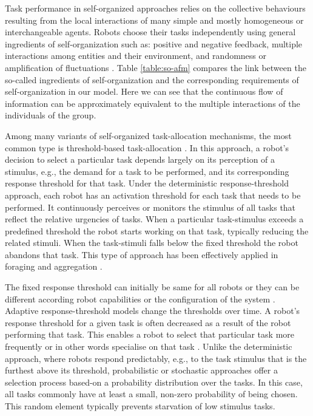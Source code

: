 \documentclass[smallcondensed]{svjour3}
\begin{document}
Task performance in self-organized approaches relies on the collective behaviours resulting from the local interactions of many simple and mostly homogeneous or interchangeable agents. Robots choose their tasks independently using general ingredients of self-organization such as: positive and negative feedback, multiple interactions among entities and their environment, and randomness or amplification of fluctuations \citep{Camazine+2001}. Table \ref{table:so-afm} compares the link between the so-called ingredients of self-organization and the corresponding requirements of self-organization in our model. Here we can see that the continuous flow of information can be approximately equivalent to the multiple interactions of the individuals of the group.

Among many variants of self-organized task-allocation mechanisms, the most common type is threshold-based task-allocation \citep{Bonabeau+1999}. In this approach, a robot's decision to select a particular task depends largely on its perception of a stimulus, e.g., the demand for a task to be performed, and its corresponding response threshold for that task. Under the deterministic response-threshold approach, each robot has an activation threshold for each task that needs to be performed. It continuously perceives or monitors the stimulus of all tasks that reflect the relative urgencies of tasks. When a particular task-stimulus exceeds a predefined threshold the robot starts working on that task, typically reducing the related stimuli. When the task-stimuli falls below the fixed threshold the robot abandons that task. This type of approach has been effectively applied in foraging \citep{Liu+2007,Krieger+2000} and aggregation \citep{Agassounon+2002}. 

The fixed response threshold can initially be same for all robots \citep{Jones+2000} or they can be different according robot capabilities or the configuration of the system \citep{Krieger+2000}. Adaptive response-threshold models change the thresholds over time. A robot's response threshold for a given task is often decreased as a result of the robot performing that task. This enables a robot to select that particular task more frequently or in other words specialise on that task \citep{Bonabeau+1999,Agassounon+2002}. Unlike the deterministic approach, where robots respond predictably, e.g., to the task stimulus that is the furthest above its threshold, probabilistic or stochastic approaches offer a selection process based-on a probability distribution over the tasks. In this case, all tasks commonly have at least a small, non-zero probability of being chosen. This random element typically prevents starvation of low stimulus tasks. 
\end{document}
